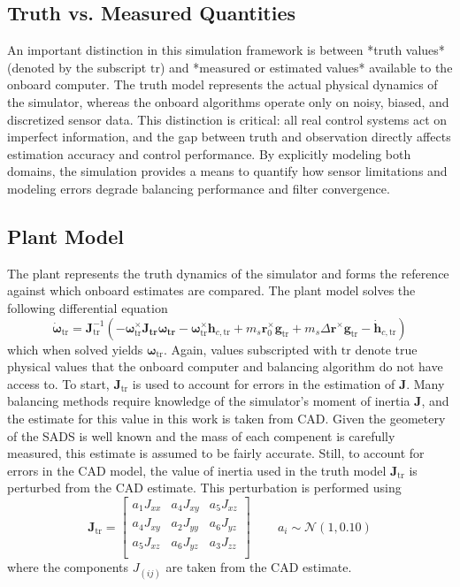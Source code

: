 \subsection{Truth vs. Measured Quantities}

An important distinction in this simulation framework is between *truth values* (denoted by the subscript $\text{tr}$) and *measured or estimated values* available to the onboard computer. The truth model represents the actual physical dynamics of the simulator, whereas the onboard algorithms operate only on noisy, biased, and discretized sensor data. This distinction is critical: all real control systems act on imperfect information, and the gap between truth and observation directly affects estimation accuracy and control performance. By explicitly modeling both domains, the simulation provides a means to quantify how sensor limitations and modeling errors degrade balancing performance and filter convergence.

\subsection{Plant Model}
The plant represents the truth dynamics of the simulator and forms the reference against which onboard estimates are compared. The plant model solves the following differential equation
\begin{equation}
    \dot{\bm{\omega}}_\text{tr} = \bm{J}_\text{tr}^{-1}(-\bm{\omega}_\text{tr}^\times \bm{J_\text{tr}\omega_\text{tr}} 
    - \bm{\omega}_\text{tr}^\times\bm{h}_{c,\text{tr}} + m_s\bm{r}_0^{\times}\bm{g}_\text{tr} + m_s\Delta\bm{r}^{\times}\bm{g}_\text{tr}
    - \dot{\bm{h}}_{c,\text{tr}})
\end{equation}
which when solved yields $\bm{\omega}_\text{tr}$. Again, values subscripted with $\text{tr}$ denote true physical values that the onboard computer and balancing algorithm do not have access to. To start, $\bm{J}_\text{tr}$ is used to account for errors in the estimation of $\bm{J}$. Many balancing methods require knowledge of the simulator's moment of inertia $\bm{J}$, and the estimate for this value in this work is taken from CAD. Given the geometery of the SADS is well known and the mass of each compenent is carefully measured, this estimate is assumed to be fairly accurate. Still, to account for errors in the CAD model, the value of inertia used in the truth model $\bm{J}_\text{tr}$ is perturbed from the CAD estimate. This perturbation is performed using
\begin{equation}
    \bm{J}_\text{tr} = \begin{bmatrix}
        a_1J_{xx} & a_4J_{xy} & a_5J_{xz} \\
        a_4J_{xy} & a_2J_{yy} & a_6J_{yz} \\
        a_5J_{xz} & a_6J_{yz} & a_3J_{zz} \\
    \end{bmatrix}\qquad\,a_i\sim\mathcal{N}(1,0.10)
\end{equation}
where the components $J_{(ij)}$ are taken from the CAD estimate.

